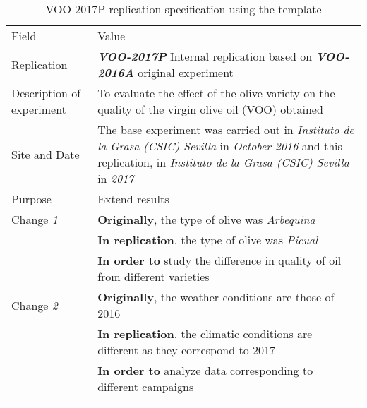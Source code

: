 \begin{table*}[h]
  \caption{VOO-2017P replication specification using the template}
\label{tab:edi}
  \centering

\begin{tabularx}{\textwidth}{
  >{\hsize=0.25\hsize}X
  >{\hsize=0.8\hsize}X}
  
    \noalign{\smallskip}\hline\noalign{\smallskip}
  
  Field &  Value  \\ 
  \noalign{\smallskip}\hline\noalign{\smallskip}
 
 Replication &   \textbf{\emph{VOO-2017P}}   Internal replication based on \textbf{\emph{VOO-2016A}}  original experiment   \\
     
 Description \newline of experiment &  To evaluate the effect of the olive variety on the quality of the virgin olive oil (VOO) obtained \\  
 
 Site and Date & The base experiment was carried out in  \textit{Instituto de la Grasa (CSIC) Sevilla}  in  \textit{October 2016} and this replication, in  \textit{Instituto de la Grasa (CSIC) Sevilla} in \textit{2017}    \\
    Purpose  &  Extend results \\  
\hline   
    Change \textit{1}   & \textbf{Originally}, the type of olive was \textit{Arbequina} \\& \textbf{In replication}, the type of olive was \textit{Picual} \\& \textbf{In order to} study the difference in quality of oil from different varieties   \\
  
\hline   
     Change \textit{2}   & \textbf{Originally}, the weather conditions are those of 2016 \\& \textbf{In replication}, the climatic conditions are different as they correspond to 2017 \\& \textbf{In order to} analyze data corresponding to different campaigns  \\
    

    
   	\noalign{\smallskip\smallskip}\hline
	\end{tabularx}  
\end{table*}
